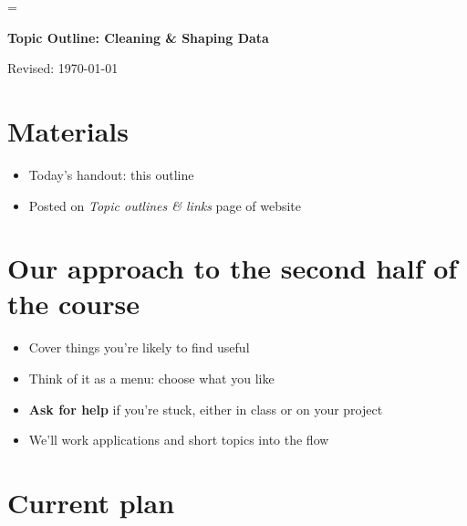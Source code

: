 \documentclass[11pt]{article}
\begin{document}
\parskip=\bigskipamount
\parindent=0.0in
\thispagestyle{empty}


\bigskip\bigskip
\centerline{\Large \bf Topic Outline:  Cleaning \& Shaping Data}
\centerline{Revised: \today}

\section*{Materials}

\begin{itemize}
\item  Today's handout:  this outline
\item  Posted on {\it Topic outlines \& links\/} page of website
\end{itemize}


\section*{Our approach to the second half of the course}

\begin{itemize}
\item Cover things you're likely to find useful 
\item Think of it as a menu:  choose what you like 
\item {\bf Ask for help} if you're stuck, either in class or on your project
\item We'll work applications and short topics into the flow
\end{itemize}


\section*{Current plan}
\end{document}
